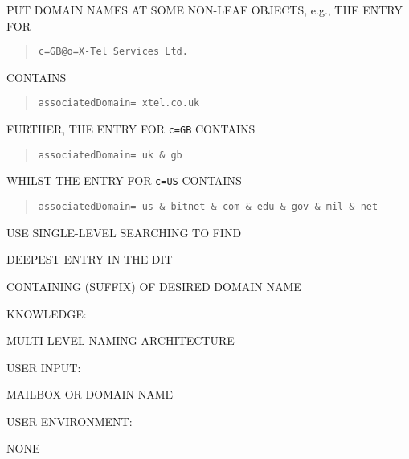 \begin{bwslide}

\begin{nrtc}
\item	PUT DOMAIN NAMES AT SOME NON-LEAF OBJECTS, e.g., THE ENTRY
FOR
\begin{quote}\begin{verbatim}
c=GB@o=X-Tel Services Ltd.
\end{verbatim}\end{quote}
CONTAINS
\begin{quote}\begin{verbatim}
associatedDomain= xtel.co.uk
\end{verbatim}\end{quote}

\item	FURTHER, THE ENTRY FOR \verb"c=GB" CONTAINS
\begin{quote}\begin{verbatim}
associatedDomain= uk & gb
\end{verbatim}\end{quote}
WHILST THE ENTRY FOR \verb"c=US" CONTAINS
\begin{quote}\begin{verbatim}
associatedDomain= us & bitnet & com & edu & gov & mil & net
\end{verbatim}\end{quote}

\item	USE SINGLE-LEVEL SEARCHING TO FIND
    \begin{nrtc}
    \item	DEEPEST ENTRY IN THE DIT
    \end{nrtc}
	CONTAINING (SUFFIX) OF DESIRED DOMAIN NAME
\end{nrtc}
\end{bwslide}


\begin{bwslide}

\begin{nrtc}
\item	KNOWLEDGE:
    \begin{nrtc}
    \item	MULTI-LEVEL NAMING ARCHITECTURE
    \end{nrtc}

\item	USER INPUT:
    \begin{nrtc}
    \item	MAILBOX OR DOMAIN NAME
    \end{nrtc}

\item	USER ENVIRONMENT:
    \begin{nrtc}
    \item	NONE
    \end{nrtc}
\end{nrtc}
\end{bwslide}


